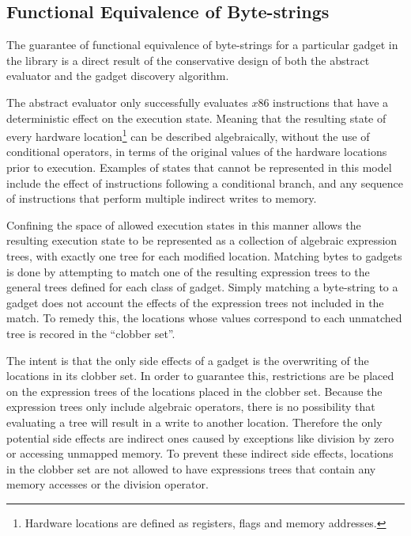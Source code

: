     \subsection{Functional Equivalence of Byte-strings}
    \label{sec:results-gadget-inst-eq}

        The guarantee of functional equivalence of byte-strings for a
        particular gadget in the library is a direct result of the
        conservative design of both the abstract evaluator and the gadget
        discovery algorithm.

        The abstract evaluator only successfully evaluates $x86$ instructions
        that have a deterministic effect on the execution state.  Meaning that
        the resulting state of every hardware location\footnote{Hardware
        locations are defined as registers, flags and memory addresses.} can be
        described algebraically, without the use of conditional operators, in
        terms of the original values of the hardware locations prior to
        execution. Examples of states that cannot be represented in this model
        include the effect of instructions following a conditional branch, and
        any sequence of instructions that perform multiple indirect writes to
        memory.

        Confining the space of allowed execution states in this manner allows
        the resulting execution state to be represented as a collection of
        algebraic expression trees, with exactly one tree for each modified
        location. Matching bytes to gadgets is done by attempting to match one
        of the resulting expression trees to the general trees defined for each
        class of gadget. Simply matching a byte-string to a gadget does not
        account the effects of the expression trees not included in the match.
        To remedy this, the locations whose values correspond to each unmatched
        tree is recored in the ``clobber set''.

        The intent is that the only side effects of a gadget is the overwriting
        of the locations in its clobber set. In order to guarantee this,
        restrictions are be placed on the expression trees of the locations
        placed in the clobber set. Because the expression trees only include
        algebraic operators, there is no possibility that evaluating a tree will
        result in a write to another location. Therefore the only potential side
        effects are indirect ones caused by exceptions like division by zero or
        accessing unmapped memory. To prevent these indirect side effects,
        locations in the clobber set are not allowed to have expressions trees
        that contain any memory accesses or the division operator.

